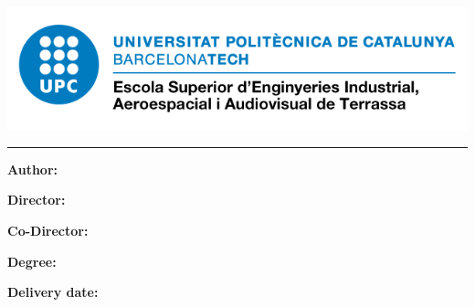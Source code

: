 
\thispagestyle{CoverPage}

\begin{center}
\includegraphics[scale=0.5]{./doc_config/image}\par
\vspace{1cm}
{\scshape\Large \School \par}
\vspace{1cm}
{\huge\bfseries \ProjectName\par}
\textcolor{cyan}{\rule{\textwidth}{.6pt}}
\vspace{2cm}
{\Large \DocType\par}
\vfill
\end{center}

\vspace{10pt}
\textbf{Author:} \Author

\textbf{Director:} \Director

\textbf{Co-Director:} \Codirector

\textbf{Degree:} \Degree

\textbf{Delivery date:} \DocDate
\vspace{10pt}